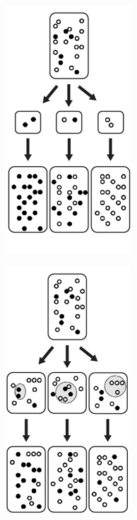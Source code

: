 \documentclass[12pt,twoside]{reedthesis}
\begin{document}
\begin{figure}[h]
     \begin{subfigure}[t]{.5\textwidth}
        \centering
        \includegraphics[width=0.5\linewidth]{../figures/cao_bottleneck_a.jpg}
        \label{bottleneck:reduced}
    \end{subfigure}%
    \begin{subfigure}[t]{.5\textwidth}
        \centering
        \includegraphics[width=0.46\linewidth]{../figures/cao_bottleneck_b.jpg}

\end{subfigure}
\end{figure}
\end{document}
